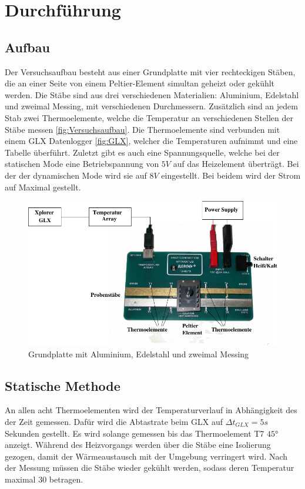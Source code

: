 \section{Durchführung}
\label{sec:Durchführung}


\subsection{Aufbau}
Der Versuchsaufbau besteht aus einer Grundplatte mit vier rechteckigen Stäben, die an einer Seite von einem Peltier-Element simultan geheizt oder gekühlt werden.
Die Stäbe sind aus drei verschiedenen Materialien:  Aluminium, Edelstahl und zweimal Messing, mit verschiedenen Durchmessern.
Zusätzlich sind an jedem Stab zwei Thermoelemente, welche die Temperatur an verschiedenen Stellen der Stäbe messen \autoref{fig:Versuchsaufbau}.
Die Thermoelemente sind verbunden mit einem GLX Datenlogger \autoref{fig:GLX}, welcher die Temperaturen aufnimmt und eine Tabelle überführt.
Zuletzt gibt es auch eine Spannungsquelle, welche bei der statischen Mode eine Betriebspannung von $5\si{V}$ auf das Heizelement überträgt. 
Bei der der dynamischen Mode wird sie auf $8\si{V}$ eingestellt. Bei beidem wird der Strom auf Maximal gestellt.

\begin{figure}[H]
    \centering
    \includegraphics{content/Abb_1.pdf}
    \caption{Grundplatte mit Aluminium, Edelstahl und zweimal Messing\cite[3]{V204}}
    \label{fig:Versuchsaufbau}
\end{figure}

\subsection{Statische Methode}
An allen acht Thermoelementen wird der Temperaturverlauf in Abhängigkeit des der Zeit gemessen.
Dafür wird die Abtastrate beim GLX auf $\Delta t_{GLX} = 5\si{s}$ Sekunden gestellt.
Es wird solange gemessen bis das Thermoelement T7 $45°$ anzeigt.
Während des Heizvorgangs werden über die Stäbe eine Isolierung gezogen, damit der Wärmeaustausch mit der Umgebung verringert wird.
Nach der Messung müssen die Stäbe wieder gekühlt werden, sodass deren Temperatur maximal $30$ betragen.

